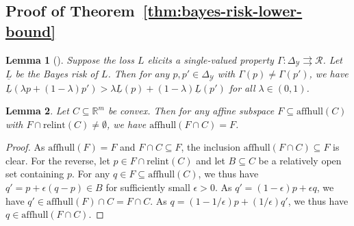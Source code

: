 \documentclass{article}
\newcommand{\Comments}{1}
\newcommand{\mynote}[2]{\ifnum\Comments=1\textcolor{#1}{#2}\fi}
\newcommand{\raf}[1]{\mynote{green!80!blue}{[RF: #1]}}
\newcommand{\bo}[1]{\mynote{blue}{[Bo: #1]}}
\newcommand{\reals}{\mathbb{R}}
\newcommand{\simplex}{\Delta_\Y}
\newcommand{\relint}[1]{\mathrm{relint}(#1)}
\newcommand{\affhull}{\mathrm{affhull}}
\newcommand{\R}{\mathcal{R}}
\newcommand{\Y}{\mathcal{Y}}
\newcommand{\lbar}{\underline{L}} %
\newcommand{\toto}{\rightrightarrows}
\newtheorem{lemma}{Lemma}
\begin{document}
\subsection{Proof of Theorem~\ref{thm:bayes-risk-lower-bound}}

\begin{lemma}[\citep{frongillo2018elicitation}]
	\label{lem:elic-complex-bayes-concave}
	Suppose the loss $L$ elicits a single-valued property $\Gamma:\simplex\toto\R$.
	Let $\lbar$ be the Bayes risk of $L$.
	Then for any $p,p'\in\simplex$ with $\Gamma(p)\neq\Gamma(p')$, we have $\lbar(\lambda p + (1-\lambda) p') > \lambda \lbar(p) + (1-\lambda) \lbar(p')$ for all $\lambda\in(0,1)$.
\end{lemma}


\begin{lemma}\label{lem:affhull-relint}
	Let $C\subseteq\reals^m$ be convex.
	Then for any affine subspace $F\subseteq\affhull(C)$ with $F\cap\relint C \neq \emptyset$, we have $\affhull(F\cap C) = F$.
\end{lemma}
\begin{proof}
	As $\affhull(F) = F$ and $F\cap C\subseteq F$, the inclusion $\affhull(F\cap C) \subseteq F$ is clear.
	For the reverse, let $p\in F\cap\relint C$ and let $B\subseteq C$ be a relatively open set containing $p$.
	For any $q\in F \subseteq \affhull(C)$, we thus have $q' = p + \epsilon (q-p) \in B$ for sufficiently small $\epsilon > 0$.
	As $q' = (1-\epsilon) p + \epsilon q$, we have $q' \in \affhull(F)\cap C = F\cap C$.
	As $q = (1-1/\epsilon) p + (1/\epsilon) q'$, we thus have $q\in\affhull(F\cap C)$.
\end{proof}
\end{document}
